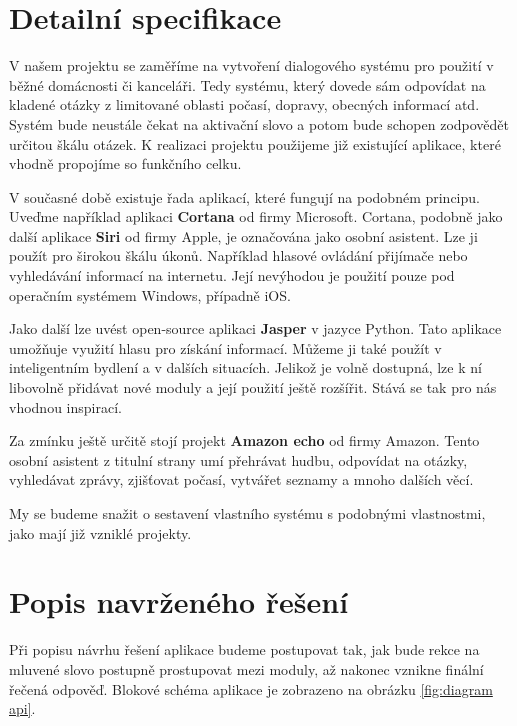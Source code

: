 \documentclass[12pt,a4paper]{article}
\begin{document}
\section*{Detailní specifikace}
V našem projektu se zaměříme na vytvoření dialogového systému pro použití v běžné domácnosti či kanceláři. Tedy systému, který dovede sám odpovídat na kladené otázky z limitované oblasti počasí, dopravy, obecných informací atd. Systém bude neustále čekat na aktivační slovo a potom bude schopen zodpovědět určitou škálu otázek. K realizaci projektu použijeme již existující aplikace, které vhodně propojíme so funkčního celku.

V současné době existuje řada aplikací, které fungují na podobném principu. Uveďme například aplikaci \textbf{Cortana} od firmy Microsoft. Cortana, podobně jako další aplikace \textbf{Siri} od firmy Apple, je označována jako osobní asistent. Lze ji použít pro širokou škálu úkonů. Například hlasové ovládání přijímače nebo vyhledávání informací na internetu. Její nevýhodou je použití pouze pod operačním systémem Windows, případně iOS. 

Jako další lze uvést open-source aplikaci \textbf{Jasper} v jazyce Python. Tato aplikace umožňuje využití hlasu pro získání informací. Můžeme ji také použít v inteligentním bydlení a v dalších situacích. Jelikož je volně dostupná, lze k ní libovolně přidávat nové moduly a její použití ještě rozšířit. Stává se tak pro nás vhodnou inspirací. 

Za zmínku ještě určitě stojí projekt \textbf{Amazon echo} od firmy Amazon. Tento osobní asistent z titulní strany umí přehrávat hudbu, odpovídat na otázky, vyhledávat zprávy, zjišťovat počasí, vytvářet seznamy a mnoho dalších věcí. 

My se budeme snažit o sestavení vlastního systému s podobnými vlastnostmi, jako mají již vzniklé projekty. 

\section*{Popis navrženého řešení}
Při popisu návrhu řešení aplikace budeme postupovat tak, jak bude rekce na mluvené slovo postupně prostupovat mezi moduly, až nakonec vznikne finální řečená odpověď. Blokové schéma aplikace je zobrazeno na obrázku \ref{fig:diagram api}.
\end{document}
